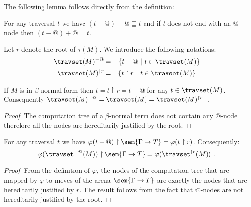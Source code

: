 The following lemma follows directly from the definition:
\begin{lem}
\label{lem:minus_at_plus_at}
For any traversal $t$ we have $(t-@)+@ \sqsubseteq t$ and if $t$ does not end with an @-node then
$(t-@)+@ = t$.
\end{lem}

Let $r$ denote the root of $\tau(M)$. We introduce the following notations:
\begin{eqnarray*}
\travset(M)^{-@} &=& \{ t - @ \ | \  t \in \travset(M) \} \\
\travset(M)^{\upharpoonright r} &=& \{ t  \upharpoonright r \ | \  t  \in \travset(M) \} \ .
\end{eqnarray*}

\begin{lem}
If $M$ is in $\beta$-normal form then $t = t \upharpoonright r = t - @$ for any $t \in \travset(M)$.
Consequently $\travset(M)^{-@} = \travset(M) =  \travset(M)^{\upharpoonright r }$\ .
\end{lem}
\begin{proof}
The computation tree of a  $\beta$-normal term does not contain any @-node therefore all the nodes are hereditarily justified by the root.
\end{proof}



\begin{lem}
\label{lem:varphi_filter}
For any traversal $t$ we have
$\varphi(t-@) \upharpoonright \sem{\Gamma \rightarrow T} = \varphi(t\upharpoonright r)$.
Consequently:
$$ \varphi(\travset^{-@}(M)) \upharpoonright \sem{\Gamma \rightarrow T} = \varphi(\travset^{\upharpoonright r}(M))\ .$$
\end{lem}
\begin{proof}
    From the definition of $\varphi$, the nodes of the computation tree that are mapped by $\varphi$
    to moves of the arena $\sem{\Gamma \rightarrow T}$ are exactly the nodes that are hereditarily justified by $r$.
    The result follows from the fact that @-nodes are not hereditarily justified by the root.
\end{proof}

